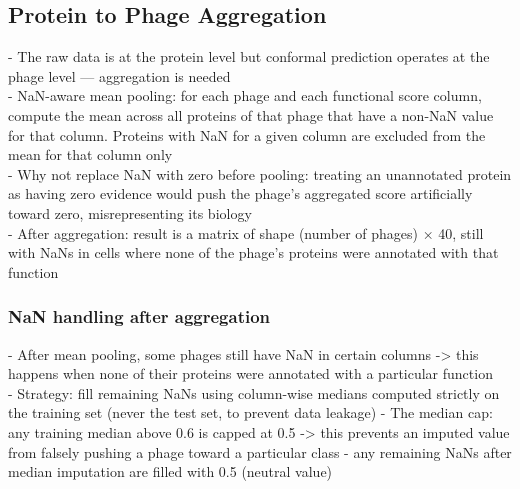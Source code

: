 \subsection{Protein to Phage Aggregation}
\noindent - The raw data is at the protein level but conformal prediction operates at the phage level — aggregation is needed\\
- NaN-aware mean pooling: for each phage and each functional score column, compute the mean across all proteins of that phage that have a non-NaN value for that column. Proteins with NaN for a given column are excluded from the mean for that column only\\
- Why not replace NaN with zero before pooling: treating an unannotated protein as having zero evidence would push the phage's aggregated score artificially toward zero, misrepresenting its biology\\
- After aggregation: result is a matrix of shape (number of phages) × 40, still with NaNs in cells where none of the phage's proteins were annotated with that function


\subsubsection{NaN handling after aggregation}
- After mean pooling, some phages still have NaN in certain columns -> this happens when none of their proteins were annotated with a particular function\\
- Strategy: fill remaining NaNs using column-wise medians computed strictly on the training set (never the test set, to prevent data leakage)
- The median cap: any training median above 0.6 is capped at 0.5 -> this prevents an imputed value from falsely pushing a phage toward a particular class
- any remaining NaNs after median imputation are filled with 0.5 (neutral value)
